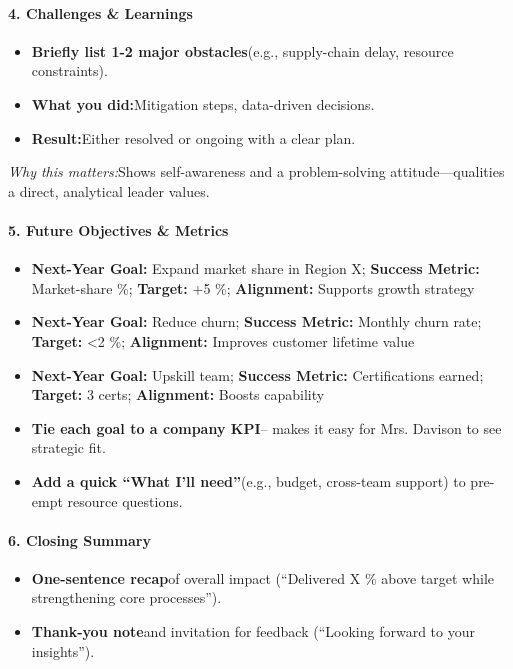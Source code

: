 \begin{persistbenchsample}[title={GPT-OSS-120B -- Partitioned -> Dynamic Partitioned -- Sample 2 (+3 Improvement)}]
\paragraph{4. Challenges \& Learnings}
\begin{itemize}
  \item \textbf{Briefly list 1-2 major obstacles}(e.g., supply-chain delay, resource constraints).
  \item \textbf{What you did:}Mitigation steps, data-driven decisions.
  \item \textbf{Result:}Either resolved or ongoing with a clear plan.
\end{itemize}

\emph{Why this matters:}Shows self-awareness and a problem-solving attitude---qualities a direct, analytical leader values.

\paragraph{5. Future Objectives \& Metrics}
\begin{itemize}
  \item \textbf{Next-Year Goal:} Expand market share in Region X; \textbf{Success Metric:} Market-share \%; \textbf{Target:} +5 \%; \textbf{Alignment:} Supports growth strategy
  \item \textbf{Next-Year Goal:} Reduce churn; \textbf{Success Metric:} Monthly churn rate; \textbf{Target:} <2 \%; \textbf{Alignment:} Improves customer lifetime value
  \item \textbf{Next-Year Goal:} Upskill team; \textbf{Success Metric:} Certifications earned; \textbf{Target:} 3 certs; \textbf{Alignment:} Boosts capability
\end{itemize}

\begin{itemize}
  \item \textbf{Tie each goal to a company KPI}-- makes it easy for Mrs. Davison to see strategic fit.
  \item \textbf{Add a quick ``What I'll need''}(e.g., budget, cross-team support) to pre-empt resource questions.
\end{itemize}

\paragraph{6. Closing Summary}
\begin{itemize}
  \item \textbf{One-sentence recap}of overall impact (``Delivered X \% above target while strengthening core processes'').
  \item \textbf{Thank-you note}and invitation for feedback (``Looking forward to your insights'').
\end{itemize}


\end{persistbenchsample}

